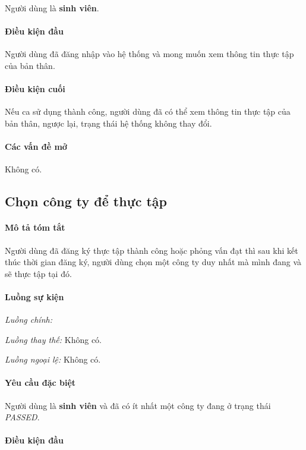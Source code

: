 \documentclass[./../main.tex]{subfiles}
\begin{document}
Người dùng là \textbf{sinh viên}.

\paragraph*{Điều kiện đầu}

Người dùng đã đăng nhập vào hệ thống và mong muốn xem thông tin thực tập
của bản thân.

\paragraph*{Điều kiện cuối}

Nếu ca sử dụng thành công, người dùng đã có thể xem thông tin thực tập
của bản thân, ngược lại, trạng thái hệ thống không thay đổi.

\paragraph*{Các vấn đề mở}

Không có.

\subsection{Chọn công ty để thực tập}

\paragraph*{Mô tả tóm tắt}

Người dùng đã đăng ký thực tập thành công hoặc phỏng vấn đạt thì sau khi
kết thúc thời gian đăng ký, người dùng chọn một công ty duy nhất mà mình
đang và sẽ thực tập tại đó.

\paragraph*{Luồng sự kiện}

\emph{Luồng chính:}

\emph{Luồng thay thế:} Không có.

\emph{Luồng ngoại lệ:} Không có.

\paragraph*{Yêu cầu đặc biệt}

Người dùng là \textbf{sinh viên} và đã có ít nhất một công ty đang ở
trạng thái \emph{PASSED}.

\paragraph*{Điều kiện đầu}
\end{document}
